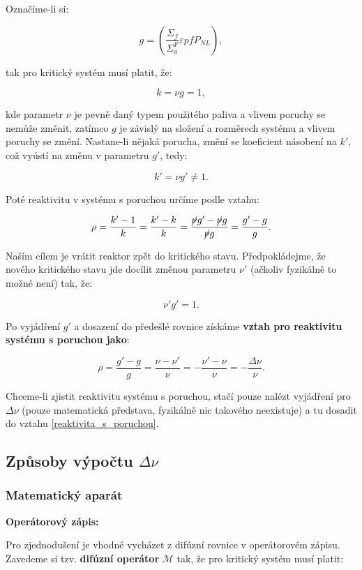 Označíme-li si:

$$  g = \left ( \dfrac{\Sigma_f}{\Sigma_a^F} \varepsilon p f P_{NL} \right ), $$

tak pro kritický systém musí platit, že:

$$ k = \nu g = 1, $$

kde parametr $\nu$ je pevně daný typem použitého paliva a vlivem poruchy se nemůže změnit, zatímco $g$ je závislý na složení a rozměrech systému a vlivem poruchy se změní. Nastane-li nějaká porucha, změní se koeficient násobení na $k'$, což vyústí na změnu v parametru $g'$, tedy:

$$ k' = \nu g' \neq 1. $$

Poté reaktivitu v systému s poruchou určíme podle vztahu:

$$ \rho = \dfrac{k'-1}{k} = \dfrac{k'-k}{k} = \dfrac{\cancel{\nu} g' - \cancel{\nu} g}{\cancel{\nu} g} = \dfrac{g'-g}{g}. $$

Naším cílem je vrátit reaktor zpět do kritického stavu. Předpokládejme, že nového kritického stavu jde docílit změnou parametru $\nu'$ (ačkoliv fyzikálně to možné není) tak, že:

$$ \nu' g' = 1. $$

Po vyjádření $g'$ a dosazení do předešlé rovnice získáme \textbf{vztah pro reaktivitu systému s poruchou jako}:

\begin{equation}
  \boxed{
  \rho = \dfrac{g'-g}{g} = \dfrac{\nu-\nu'}{\nu} = - \dfrac{\nu'-\nu}{\nu} = - \dfrac{\Delta \nu}{\nu}.
  \label{reaktivita_s_poruchou}}
\end{equation}

Chceme-li zjistit reaktivitu systému s poruchou, stačí pouze nalézt vyjádření pro $\Delta \nu$ (pouze matematická představa, fyzikálně nic takového neexistuje) a tu dosadit do vztahu \eqref{reaktivita_s_poruchou}.

\subsection{Způsoby výpočtu $\Delta \nu$}

\subsubsection{Matematický aparát}

\textbf{Operátorový zápis:}

Pro zjednodušení je vhodné vycházet z difúzní rovnice v operátorovém zápisu. Zavedeme si tzv. \textbf{difúzní operátor} $\mathcal{M}$ tak, že pro kritický systém musí platit:

